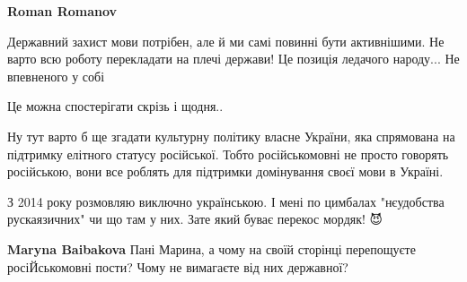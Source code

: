\begin{itemize}
\begin{itemize}
\textbf{Roman Romanov} 

Державний захист мови потрібен, але й ми самі повинні бути активнішими. Не
варто всю роботу перекладати на плечі держави! Це позиція ледачого народу... Не
впевненого у собі
\end{itemize}

 
Це можна спостерігати скрізь і щодня..

 

Ну тут варто б ще згадати культурну політику власне України, яка спрямована на
підтримку елітного статусу російської. Тобто російськомовні не просто говорять
російською, вони все роблять для підтримки домінування своєї мови в Україні.


 

З 2014 року розмовляю виключно українською. І мені по цимбалах "нєудобства
рускаязичних" чи що там у них. Зате який буває перекос мордяк! 😈

\begin{itemize}
 
\textbf{Maryna Baibakova} Пані Марина, а чому на своїй сторінці перепощуєте росіЙськомовні пости? Чому не вимагаєте від них державної?

 

\end{itemize}
\end{itemize}
